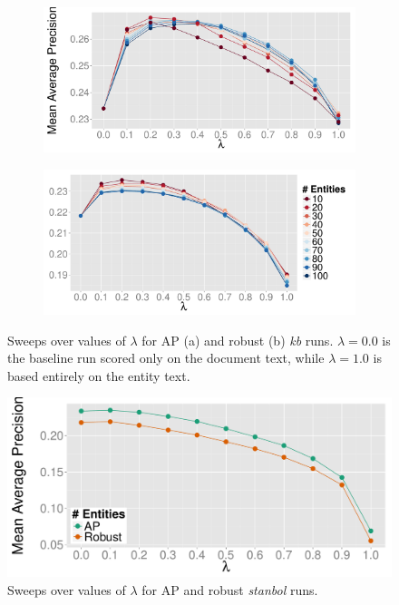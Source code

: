 \documentclass{sig-alternate}
\begin{document}
\begin{figure}[!htb]
\centering
\begin{subfigure}{\columnwidth}
\centering
\includegraphics[width=.9\columnwidth]{figures/sweep-entities-AP.pdf}
\end{subfigure}%
\begin{subfigure}{\columnwidth}
\centering
\includegraphics[width=.9\columnwidth]{figures/sweep-entities-robust.pdf}
\end{subfigure}
\caption{Sweeps over values of $\lambda$ for AP (a) and robust (b) \textit{kb} runs. $\lambda=0.0$ is the baseline run scored only on the document text, while $\lambda=1.0$ is based entirely on the entity text.}
\label{figure.sweeps-ql}
\end{figure}

\begin{figure}[!htb]
\centering
\includegraphics[width=.85\columnwidth]{figures/sweep-stanbol.pdf}
\caption{Sweeps over values of $\lambda$ for AP and robust \textit{stanbol} runs.}
\label{figure.sweeps-stanbol}
\end{figure}
\end{document}
